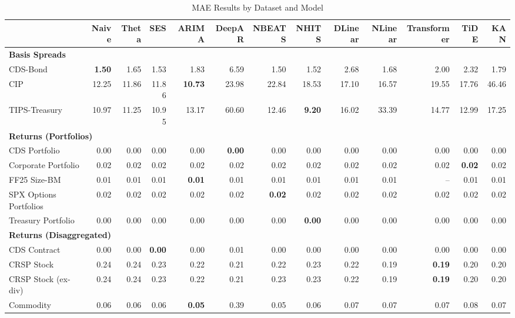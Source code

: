 
\begin{table}[htbp]
\centering
\caption{MAE Results by Dataset and Model}
\label{tab:mae_results}
\scriptsize
\setlength{\tabcolsep}{1.5pt}
\renewcommand{\arraystretch}{0.9}
\begin{tabular}{@{}lrrrrrrrrrrrr@{}}
\toprule
 & Naive & Theta & SES & ARIMA & DeepAR & NBEATS & NHITS & DLinear & NLinear & Transformer & TiDE & KAN \\
\midrule
\multicolumn{13}{l}{\textbf{Basis Spreads}} \\
CDS-Bond & \textbf{1.50} & 1.65 & 1.53 & 1.83 & 6.59 & 1.50 & 1.52 & 2.68 & 1.68 & 2.00 & 2.32 & 1.79 \\
CIP & 12.25 & 11.86 & 11.86 & \textbf{10.73} & 23.98 & 22.84 & 18.53 & 17.10 & 16.57 & 19.55 & 17.76 & 46.46 \\
TIPS-Treasury & 10.97 & 11.25 & 10.95 & 13.17 & 60.60 & 12.46 & \textbf{9.20} & 16.02 & 33.39 & 14.77 & 12.99 & 17.25 \\
\midrule
\multicolumn{13}{l}{\textbf{Returns (Portfolios)}} \\
CDS Portfolio & 0.00 & 0.00 & 0.00 & 0.00 & \textbf{0.00} & 0.00 & 0.00 & 0.00 & 0.00 & 0.00 & 0.00 & 0.00 \\
Corporate Portfolio & 0.02 & 0.02 & 0.02 & 0.02 & 0.02 & 0.02 & 0.02 & 0.02 & 0.02 & 0.02 & \textbf{0.02} & 0.02 \\
FF25 Size-BM & 0.01 & 0.01 & 0.01 & \textbf{0.01} & 0.01 & 0.01 & 0.01 & 0.01 & 0.01 & -- & 0.01 & 0.01 \\
SPX Options Portfolios & 0.02 & 0.02 & 0.02 & 0.02 & 0.02 & \textbf{0.02} & 0.02 & 0.02 & 0.02 & 0.02 & 0.02 & 0.02 \\
Treasury Portfolio & 0.00 & 0.00 & 0.00 & 0.00 & 0.00 & 0.00 & \textbf{0.00} & 0.00 & 0.00 & 0.00 & 0.00 & 0.00 \\
\midrule
\multicolumn{13}{l}{\textbf{Returns (Disaggregated)}} \\
CDS Contract & 0.00 & 0.00 & \textbf{0.00} & 0.00 & 0.01 & 0.00 & 0.00 & 0.00 & 0.00 & 0.00 & 0.00 & 0.00 \\
CRSP Stock & 0.24 & 0.24 & 0.23 & 0.22 & 0.21 & 0.22 & 0.23 & 0.22 & 0.19 & \textbf{0.19} & 0.20 & 0.20 \\
CRSP Stock (ex-div) & 0.24 & 0.24 & 0.23 & 0.22 & 0.21 & 0.23 & 0.23 & 0.22 & 0.19 & \textbf{0.19} & 0.20 & 0.20 \\
Commodity & 0.06 & 0.06 & 0.06 & \textbf{0.05} & 0.39 & 0.05 & 0.06 & 0.07 & 0.07 & 0.07 & 0.08 & 0.07 \\

\end{tabular}
\end{table}
